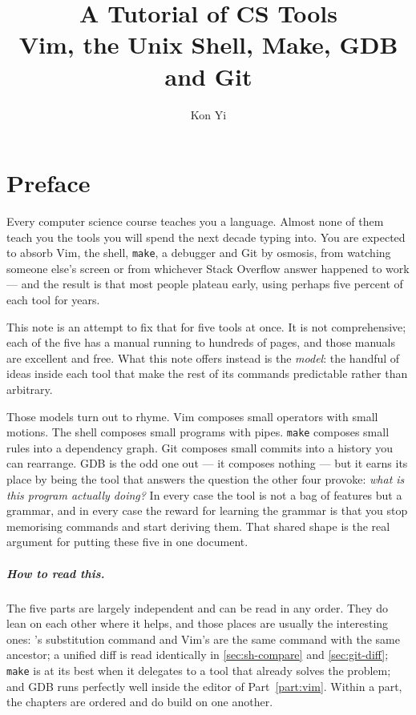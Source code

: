 \documentclass[a4paper,oneside]{scrbook}
\author{Kon Yi}
\title{A Tutorial of CS Tools \\ Vim, the Unix Shell, Make, GDB and Git}
\begin{document}
\maketitle

\chapter*{Preface}\label{ch:preface}

Every computer science course teaches you a language. Almost none of them teach
you the tools you will spend the next decade typing into. You are expected to
absorb Vim, the shell, \texttt{make}, a debugger and Git by osmosis, from
watching someone else's screen or from whichever Stack Overflow answer happened
to work --- and the result is that most people plateau early, using perhaps five
percent of each tool for years.

This note is an attempt to fix that for five tools at once. It is not
comprehensive; each of the five has a manual running to hundreds of pages, and
those manuals are excellent and free. What this note offers instead is the
\emph{model}: the handful of ideas inside each tool that make the rest of its
commands predictable rather than arbitrary.

Those models turn out to rhyme. Vim composes small operators with small motions.
The shell composes small programs with pipes. \texttt{make} composes small rules
into a dependency graph. Git composes small commits into a history you can
rearrange. GDB is the odd one out --- it composes nothing --- but it earns its
place by being the tool that answers the question the other four provoke:
\emph{what is this program actually doing?} In every case the tool is not a bag
of features but a grammar, and in every case the reward for learning the grammar
is that you stop memorising commands and start deriving them. That shared shape
is the real argument for putting these five in one document.

\paragraph{How to read this.}
The five parts are largely independent and can be read in any order. They do
lean on each other where it helps, and those places are usually the interesting
ones: 's substitution command and Vim's  are the same command
with the same ancestor; a unified diff is read identically in
\autoref{sec:sh-compare} and \autoref{sec:git-diff}; \texttt{make} is at its best
when it delegates to a tool that already solves the problem; and GDB runs
perfectly well inside the editor of Part~\ref{part:vim}. Within a part, the
chapters are ordered and do build on one another.
\end{document}
